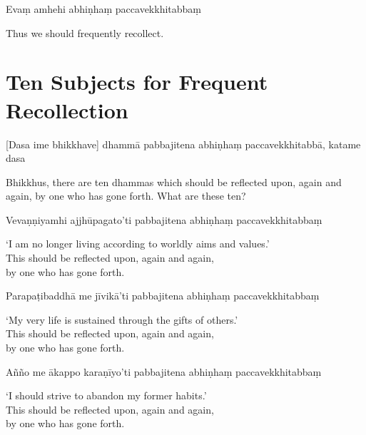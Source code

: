 Evaṃ amhehi abhiṇhaṃ paccavekkhitabbaṃ

\begin{english}
  Thus we should frequently recollect.
\end{english}


\section{Ten Subjects for Frequent Recollection}


\begin{leader}
\end{leader}

[Dasa ime bhikkhave] dhammā pabbajitena abhiṇhaṃ paccavekkhitabbā, katame dasa

\begin{english}
  Bhikkhus, there are ten dhammas which should be reflected upon, again and again, by one who has gone forth. What are these ten?
\end{english}

Vevaṇṇiyamhi ajjhūpagato'ti pabbajitena abhiṇhaṃ paccavekkhitabbaṃ

\begin{english}
  `I am no longer living according to worldly aims and values.'\\
  This should be reflected upon, again and again,\\
  by one who has gone forth.
\end{english}

Parapaṭibaddhā me jīvikā'ti pabbajitena abhiṇhaṃ paccavekkhitabbaṃ

\begin{english}
  `My very life is sustained through the gifts of others.'\\
  This should be reflected upon, again and again,\\
  by one who has gone forth.
\end{english}

Añño me ākappo karaṇīyo'ti pabbajitena abhiṇhaṃ paccavekkhitabbaṃ

\begin{english}
  `I should strive to abandon my former habits.'\\
  This should be reflected upon, again and again,\\
  by one who has gone forth.
\end{english}

